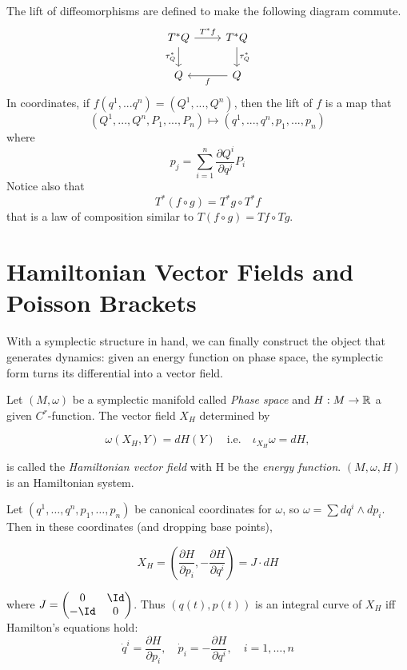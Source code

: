 \begin{remark}
	The lift of diffeomorphisms are defined to make the following diagram commute.
	\[
	\begin{tikzcd}
		T^*Q \arrow[r, "T^*f"] \arrow[d, "\tau_Q^*"'] & T^*Q \arrow[d, "\tau_Q^*"] \\
		Q & Q \arrow[l, "f"]
	\end{tikzcd}
	\]
	In coordinates, if $f(q^1,...q^n) = (Q^1,...,Q^n)$, then the lift of $f$ is a map that 
	\[
		(Q^1,...,Q^n, P_1,...,P_n) \mapsto (q^1,...,q^n, p_1,...,p_n)
	\] 
	where
	\[
		p_j = \sum_{i=1}^n \frac{\partial Q^i}{\partial q^j} P_i
	\]
	Notice also that
	\[
	T^*(f \circ g) = T^*g \circ T^*f
	\]
	that is a law of composition similar to $T(f \circ g) = Tf \circ Tg$.
\end{remark}

\section{Hamiltonian Vector Fields and Poisson Brackets}
With a symplectic structure in hand, we can finally construct the object that generates dynamics: given an energy function on phase space, the symplectic form turns its differential into a vector field.
\begin{definition}\label{def:ham-field}
	Let $(M, \omega)$ be a symplectic manifold called \emph{Phase space} and $H : M \to \mathbb{R}$ a given $C^r$-function. The vector field $X_H$ determined by 
	
	\begin{equation}
		\omega(X_H, Y) = dH(Y) \quad \text{i.e.} \quad \iota_{X_H}\omega=dH, \label{eq:hamiltonian}
	\end{equation}
	
	is called the \emph{Hamiltonian vector field} with H be the \emph{energy function}. $(M, \omega, H)$ is an Hamiltonian system.
\end{definition}

\begin{theorem}\label{prop:ham-eq}
Let $(q^1,\ldots,q^n,p_1,\ldots,p_n)$ be canonical coordinates for $\omega$, so $\omega = \sum dq^i \wedge dp_i$. Then in these coordinates (and dropping base points),

\begin{equation}
	X_H = \left( \frac{\partial H}{\partial p_i}, -\frac{\partial H}{\partial q^i} \right) = J \cdot dH \label{eq:ham-field}
\end{equation}

where $J = \begin{pmatrix} 0 & \Id \\ -\Id & 0 \end{pmatrix}$. Thus $(q(t),p(t))$ is an integral curve of $X_H$ iff Hamilton's equations hold:
\[
\boxed{ \dot{q}^i = \frac{\partial H}{\partial p_i}, \quad \dot{p}_i = -\frac{\partial H}{\partial q^i}, \quad i = 1,\ldots,n}
\]
\end{theorem}

